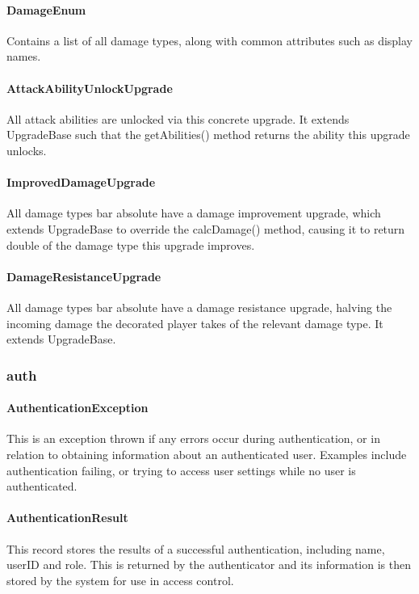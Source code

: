 \documentclass[11pt]{article}
\begin{document}
\paragraph{DamageEnum}
Contains a list of all damage types, along with common attributes such as display names. 

\paragraph{AttackAbilityUnlockUpgrade}
All attack abilities are unlocked via this concrete upgrade. It extends UpgradeBase such that the getAbilities() method returns the ability this upgrade unlocks. 

\paragraph{ImprovedDamageUpgrade}
All damage types bar absolute have a damage improvement upgrade, which extends UpgradeBase to override the calcDamage() method, causing it to return double of the damage type this upgrade improves. 

\paragraph{DamageResistanceUpgrade}
All damage types bar absolute have a damage resistance upgrade, halving the incoming damage the decorated player takes of the relevant damage type. It extends UpgradeBase. 

\subsubsection{auth}

\paragraph{AuthenticationException}
This is an exception thrown if any errors occur during authentication, or in relation to obtaining information about an authenticated user. Examples include authentication failing, or trying to access user settings while no user is authenticated. 

\paragraph{AuthenticationResult}
This record stores the results of a successful authentication, including name, userID and role. This is returned by the authenticator and its information is then stored by the system for use in access control. 
\end{document}
